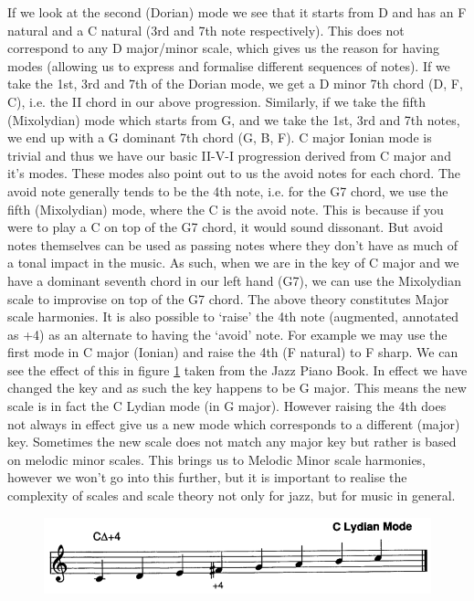 \documentclass[pdftex,12pt,a4paper]{report}
\begin{document}
If we look at the second (Dorian) mode we see that it starts from D and has an F natural and a C natural (3rd and 7th note respectively). This does not correspond to any D major/minor scale, which gives us the reason for having modes (allowing us to express and formalise different sequences of notes). If we take the 1st, 3rd and 7th of the Dorian mode, we get a D minor 7th chord (D, F, C), i.e. the II chord in our above progression. Similarly, if we take the fifth (Mixolydian) mode which starts from G, and we take the 1st, 3rd and 7th notes, we end up with a G dominant 7th chord (G, B, F). C major Ionian mode is trivial and thus we have our basic II-V-I progression derived from C major and it's modes. 
These modes also point out to us the avoid notes for each chord. The avoid note generally tends to be the 4th note, i.e. for the G7 chord, we use the fifth (Mixolydian) mode, where the C is the avoid note. This is because if you were to play a C on top of the G7 chord, it would sound dissonant. But avoid notes themselves can be used as passing notes where they don't have as much of a tonal impact in the music. As such, when we are in the key of C major and we have a dominant seventh chord in our left hand (G7), we can use the Mixolydian scale to improvise on top of the G7 chord. The above theory constitutes Major scale harmonies. It is also possible to `raise' the 4th note (augmented, annotated as +4) as an alternate to having the `avoid' note. For example we may use the first mode in C major (Ionian) and raise the 4th (F natural) to F sharp. We can see the effect of this in figure \ref{fig:clydian} taken from the Jazz Piano Book. In effect we have changed the key and as such the key happens to be G major. This means the new scale is in fact the C Lydian mode (in G major). However raising the 4th does not always in effect give us a new mode which corresponds to a different (major) key. Sometimes the new scale does not match any major key but rather is based on melodic minor scales. This brings us to Melodic Minor scale harmonies, however we won't go into this further, but it is important to realise the complexity of scales and scale theory not only for jazz, but for music in general.

\begin{figure}[here]
  \centering
  \includegraphics[scale=0.45]{figure/clydian.png}
  \label{fig:clydian}
\end{figure}
\end{document}
